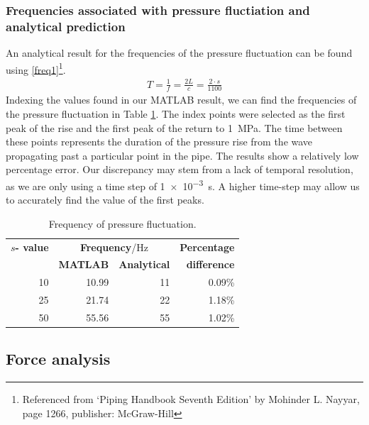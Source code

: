 \subsubsection{Frequencies associated with pressure fluctiation and analytical prediction}
An analytical result for the frequencies of the pressure fluctuation can be found using \eqref{freq1}\footnote{Referenced from `Piping Handbook Seventh Edition' by Mohinder L. Nayyar, page 1266, publisher: McGraw-Hill}.
\begin{gather}\label{freq1}
    T = \frac{1}{f} = \frac{2L}{c} = \frac{2\cdot s}{1100}
\end{gather}
Indexing the values found in our MATLAB result, we can find the frequencies of the pressure fluctuation in Table \ref{freq2}. The index points were selected as the first peak of the rise and the first peak of the return to \SI{1}{\mega\pascal}. The time between these points represents the duration of the pressure rise from the wave propagating past a particular point in the pipe. The results show a relatively low percentage error. Our discrepancy may stem from a lack of temporal resolution, as we are only using a time step of \SI{1e-3}{\second}. A higher time-step may allow us to accurately find the value of the first peaks.
\begin{table}[H]
    \centering
    \begin{tabular}{@{}rrrr@{}}
        \toprule
        \textbf{$s$- value} & \multicolumn{2}{c}{\textbf{Frequency}/\si{\hertz}} & \textbf{Percentage}                       \\
                            & \textbf{MATLAB}                                    & \textbf{Analytical} & \textbf{difference} \\
        \midrule
        10                  & 10.99                                              & 11                  & 0.09\%              \\
        25                  & 21.74                                              & 22                  & 1.18\%              \\
        50                  & 55.56                                              & 55                  & 1.02\%              \\
        \bottomrule
    \end{tabular}
    \caption{Frequency of pressure fluctuation.}
    \label{freq2}
\end{table}
\subsection{Force analysis}
